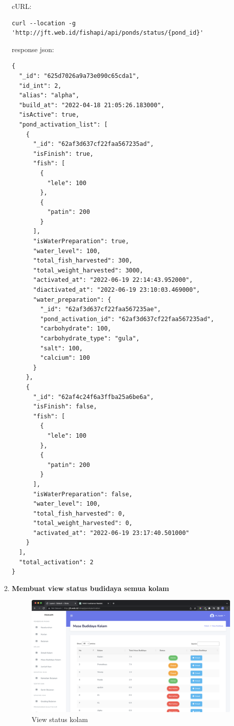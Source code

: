 \begin{enumerate}[1.]
cURL:
\begin{lstlisting}
curl --location -g 'http://jft.web.id/fishapi/api/ponds/status/{pond_id}'
\end{lstlisting}

response json:
\begin{lstlisting}
{
  "_id": "625d7026a9a73e090c65cda1",
  "id_int": 2,
  "alias": "alpha",
  "build_at": "2022-04-18 21:05:26.183000",
  "isActive": true,
  "pond_activation_list": [
    {
      "_id": "62af3d637cf22faa567235ad",
      "isFinish": true,
      "fish": [
        {
          "lele": 100
        },
        {
          "patin": 200
        }
      ],
      "isWaterPreparation": true,
      "water_level": 100,
      "total_fish_harvested": 300,
      "total_weight_harvested": 3000,
      "activated_at": "2022-06-19 22:14:43.952000",
      "diactivated_at": "2022-06-19 23:10:03.469000",
      "water_preparation": {
        "_id": "62af3d637cf22faa567235ae",
        "pond_activation_id": "62af3d637cf22faa567235ad",
        "carbohydrate": 100,
        "carbohydrate_type": "gula",
        "salt": 100,
        "calcium": 100
      }
    },
    {
      "_id": "62af4c24f6a3ffba25a6be6a",
      "isFinish": false,
      "fish": [
        {
          "lele": 100
        },
        {
          "patin": 200
        }
      ],
      "isWaterPreparation": false,
      "water_level": 100,
      "total_fish_harvested": 0,
      "total_weight_harvested": 0,
      "activated_at": "2022-06-19 23:17:40.501000"
    }
  ],
  "total_activation": 2
}
\end{lstlisting}

\item \textbf{Membuat view status budidaya semua kolam}

\begin{figure}[H]
	\centering
	\includegraphics[width=1\textwidth]{gambar/Sprint04/view/view_status_kolam}
	\caption{View status kolam}
	\label{fig:view_status_kolam}
\end{figure}



\end{enumerate}
